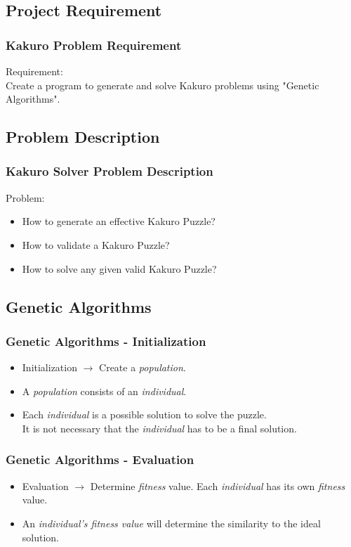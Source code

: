 \documentclass{beamer}
\begin{document}
		\subsection{Project Requirement}
			\begin{frame}
				\frametitle{Kakuro Problem Requirement}
				Requirement:\\
				\hspace{1cm}Create a program to generate and solve Kakuro problems using "Genetic Algorithms".
			\end{frame}

		\subsection{Problem Description}
			\begin{frame}
				\frametitle{Kakuro Solver Problem Description}
				Problem:
				\begin{itemize} [<+->]
					\item How to generate an effective Kakuro Puzzle?
					\item How to validate a Kakuro Puzzle?
					\item How to solve any given valid Kakuro Puzzle?
				\end{itemize} 
			\end{frame}
	
		\subsection{Genetic Algorithms}
			\begin{frame}
				\frametitle{Genetic Algorithms - Initialization}
				\begin{itemize} [<+->]
					\item Initialization $\rightarrow$ Create a {\it population}.
					\item A {\it population} consists of an {\it individual}.
					\item Each {\it individual} is a possible solution to solve the puzzle.\\It is not necessary that the {\it individual} has to be a final solution.
				\end{itemize} 
			\end{frame}

			\begin{frame}
				\frametitle{Genetic Algorithms - Evaluation}
				\begin{itemize} [<+->]
					\item Evaluation $\rightarrow$ Determine {\it fitness} value. Each {\it individual} has its own {\it fitness} value.
					\item An {\it individual's fitness value} will determine the similarity to the ideal solution.
				\end{itemize} 
			\end{frame}
\end{document}

